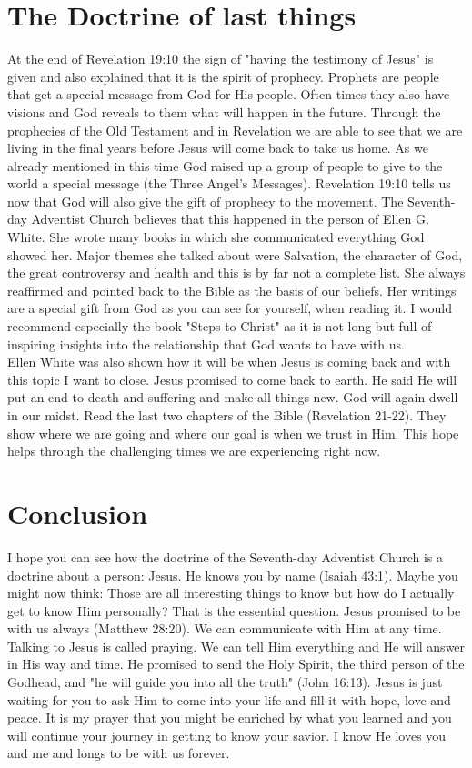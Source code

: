 \section{The Doctrine of last things}
At the end of Revelation 19:10 the sign of "having the testimony of Jesus" is given and also explained that it is the spirit of prophecy. Prophets are people that get a special message from God for His people. Often times they also have visions and God reveals to them what will happen in the future. Through the prophecies of the Old Testament and in Revelation we are able to see that we are living in the final years before Jesus will come back to take us home. As we already mentioned in this time God raised up a group of people to give to the world a special message (the Three Angel's Messages). Revelation 19:10 tells us now that God will also give the gift of prophecy to the movement. The Seventh-day Adventist Church believes that this happened in the person of Ellen G. White. She wrote many books in which she communicated everything God showed her. Major themes she talked about were Salvation, the character of God, the great controversy and health and this is by far not a complete list. She always reaffirmed and pointed back to the Bible as the basis of our beliefs. Her writings are a special gift from God as you can see for yourself, when reading it. I would recommend especially the book "Steps to Christ" as it is not long but full of inspiring insights into the relationship that God wants to have with us.\\
Ellen White was also shown how it will be when Jesus is coming back and with this topic I want to close. Jesus promised to come back to earth. He said He will put an end to death and suffering and make all things new. God will again dwell in our midst. Read the last two chapters of the Bible (Revelation 21-22). They show where we are going and where our goal is when we trust in Him. This hope helps through the challenging times we are experiencing right now.
\section{Conclusion}
I hope you can see how the doctrine of the Seventh-day Adventist Church is a doctrine about a person: Jesus. He knows you by name (Isaiah 43:1). Maybe you might now think: Those are all interesting things to know but how do I actually get to know Him personally? That is the essential question.
Jesus promised to be with us always (Matthew 28:20). We can communicate with Him at any time. Talking to Jesus is called praying. We can tell Him everything and He will answer in His way and time. He promised to send the Holy Spirit, the third person of the Godhead, and "he will guide you into all the truth" (John 16:13). Jesus is just waiting for you to ask Him to come into your life and fill it with hope, love and peace.
It is my prayer that you might be enriched by what you learned and you will continue your journey in getting to know your savior. I know He loves you and me and longs to be with us forever.